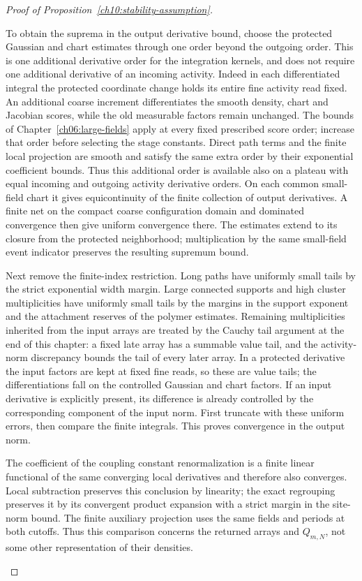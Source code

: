 \begin{proof}[Proof of Proposition~\ref{ch10:stability-assumption}]
\begin{enumerate}[label=\emph{Step \arabic*.},ref=\arabic*,leftmargin=*,align=left]
To obtain the suprema in the output derivative bound, choose the
protected Gaussian and chart estimates through one order beyond the
outgoing order. This is one additional derivative order for the
integration kernels, and does not require one additional derivative
of an incoming activity. Indeed in each differentiated integral the
protected coordinate change holds its entire fine activity read
fixed. An additional coarse increment differentiates the smooth
density, chart and Jacobian scores, while the old measurable factors
remain unchanged. The bounds of Chapter~\ref{ch06:large-fields} apply
at every fixed prescribed score order; increase that order before
selecting the stage constants. Direct path terms and the finite
local projection are smooth and satisfy the same extra order by
their exponential coefficient bounds. Thus this additional order is available
also on a plateau with equal incoming and outgoing activity derivative
orders. On each common small-field chart it gives equicontinuity of the
finite collection of output derivatives. A finite net on the compact
coarse configuration domain and dominated convergence then give
uniform convergence there. The estimates extend to its closure from
the protected neighborhood; multiplication by the same small-field event indicator
preserves the resulting supremum bound.

Next remove the finite-index restriction. Long paths have uniformly
small tails by the strict exponential width margin. Large connected
supports and high cluster multiplicities have uniformly small tails
by the margins in the support exponent and the attachment reserves of the polymer estimates.
Remaining multiplicities inherited from the input arrays are treated
by the Cauchy tail argument at the end of this chapter: a fixed late
array has a summable value tail, and the activity-norm discrepancy
bounds the tail of every later array. In a protected derivative the
input factors are kept at fixed fine reads, so these are value tails;
the differentiations fall on the controlled Gaussian and chart
factors. If an input derivative is explicitly present, its difference
is already controlled by the corresponding component of the input
norm. First truncate with these uniform errors, then compare the
finite integrals. This proves convergence in the output norm.

The coefficient of the coupling constant renormalization is a finite linear functional of the same
converging local derivatives and therefore also converges. Local
subtraction preserves this conclusion by linearity; the exact regrouping preserves
it by its convergent product expansion with a strict margin in the
site-norm bound. The finite auxiliary projection uses the same fields and
periods at both cutoffs. Thus this comparison concerns the
returned arrays and $Q_{m,N}$, not some other representation of their
densities.


\end{enumerate}
\end{proof}
